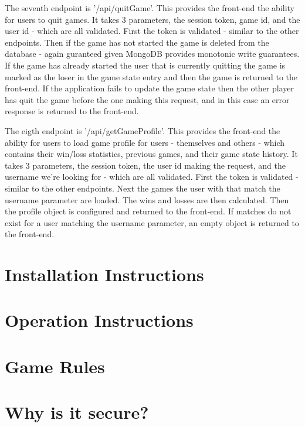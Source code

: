 \documentclass[12pt]{article}
\begin{document}
The seventh endpoint is '/api/quitGame'. This provides the front-end the ability for users to quit games. It takes 3 parameters, the session token, game id, and the user id - which are all validated. First the token is validated - similar to the other endpoints. Then if the game has not started the game is deleted from the database - again guranteed given MongoDB provides monotonic write guarantees. If the game has already started the user that is currently quitting the game is marked as the loser in the game state entry and then the game is returned to the front-end. If the application fails to update the game state then the other player has quit the game before the one making this request, and in this case an error response is returned to the front-end.

The eigth endpoint is '/api/getGameProfile'. This provides the front-end the ability for users to load game profile for users - themselves and others - which contains their win/loss statistics, previous games, and their game state history. It takes 3 parameters, the session token, the user id making the request, and the username we're looking for - which are all validated. First the token is validated - similar to the other endpoints. Next the games the user with that match the username parameter are loaded. The wins and losses are then calculated. Then the profile object is configured and returned to the front-end. If matches do not exist for a user matching the username parameter, an empty object is returned to the front-end.
\maketitle
\section{Installation Instructions}

\maketitle
\section{Operation Instructions}

\maketitle
\section{Game Rules}

\maketitle
\section{Why is it secure?}
\end{document}
